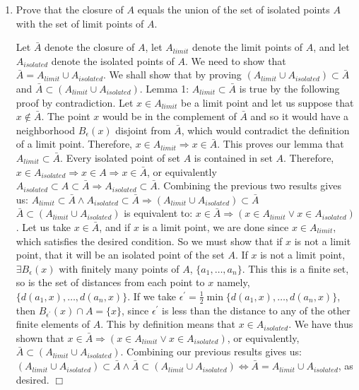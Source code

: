 \documentclass[12pt,letterpaper,reqno]{amsart}
\begin{document}
\begin{enumerate}[1.]
\item Prove that the closure of $A$ equals the union of the set of isolated points $A$ with the set of limit points of $A$.
\begin{flushleft}
Let $\bar{A}$ denote the closure of $A$, let $A_{limit}$ denote the limit points of $A$, and let $A_{isolated}$ denote the isolated points of $A$. We need to show that $\bar{A} = A_{limit} \cup A_{isolated}$. We shall show that by proving $(A_{limit} \cup A_{isolated}) \subset \bar{A}$ and $\bar{A} \subset (A_{limit} \cup A_{isolated})$. \newline Lemma 1: $A_{limit} \subset \bar{A}$ is true by the following proof by contradiction. Let $x \in A_{limit}$ be a limit point and let us suppose that $x \not\in \bar{A}$. The point $x$ would be in the complement of $\bar{A}$ and so it would have a neighborhood $B_\epsilon(x)$ disjoint from $\bar{A}$, which would contradict the definition of a limit point. Therefore, $x \in A_{limit} \Rightarrow x \in \bar{A}$. This proves our lemma that $A_{limit} \subset \bar{A}$.
\newline Every isolated point of set $A$ is contained in set $A$. Therefore, $x \in A_{isolated} \Rightarrow x \in A \Rightarrow x \in \bar{A}$, or equivalently $A_{isolated} \subset A \subset \bar{A} \Rightarrow A_{isolated} \subset \bar{A}$. Combining the previous two results gives us: $A_{limit} \subset \bar{A} \wedge A_{isolated} \subset \bar{A} \Rightarrow (A_{limit} \cup A_{isolated}) \subset \bar{A}$
\newline $\bar{A} \subset (A_{limit} \cup A_{isolated})$ is equivalent to: $x \in \bar{A} \Rightarrow (x \in A_{limit} \vee x \in A_{isolated})$. Let us take $x \in \bar{A}$, and if $x$ is a limit point, we are done since $x \in A_{limit}$, which satisfies the desired condition. So we must show that if $x$ is not a limit point, that it will be an isolated point of the set $A$. If $x$ is not a limit point, $\exists B_\epsilon(x)$ with finitely many points of $A$, $\{a_1, \ldots, a_n\}$. This this is a finite set, so is the set of distances from each point to $x$ namely, $\{d(a_1,x), \ldots, d(a_n, x)\}$. If we take $\epsilon^\prime = \frac{1}{2} \min\{d(a_1,x), \ldots, d(a_n, x)\}$, then $B_{\epsilon^\prime}(x) \cap A = \{x\}$, since $\epsilon^\prime$ is less than the distance to any of the other finite elements of $A$. This by definition means that $x \in A_{isolated}$. We have thus shown that $x \in \bar{A} \Rightarrow (x \in A_{limit} \vee x \in A_{isolated})$, or equivalently, $\bar{A} \subset (A_{limit} \cup A_{isolated})$. Combining our previous results gives us: $(A_{limit} \cup A_{isolated}) \subset \bar{A} \wedge \bar{A} \subset (A_{limit} \cup A_{isolated}) \Leftrightarrow \bar{A} = A_{limit} \cup A_{isolated}$, as desired. $\Box$
\end{flushleft}


\end{enumerate}
\end{document}
